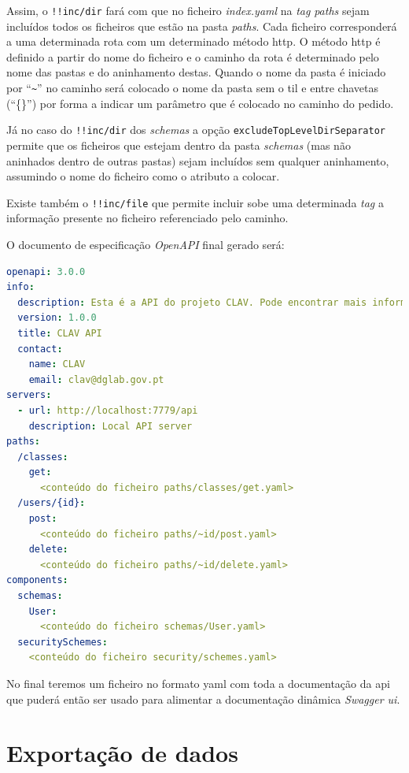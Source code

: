 Assim, o \texttt{!!inc/dir} fará com que no ficheiro \textit{index.yaml} na \textit{tag} \textit{paths} sejam incluídos todos os ficheiros que estão na pasta \textit{paths}. Cada ficheiro corresponderá a uma determinada rota com um determinado método \acrshort{http}. O método \acrshort{http} é definido a partir do nome do ficheiro e o caminho da rota é determinado pelo nome das pastas e do aninhamento destas. Quando o nome da pasta é iniciado por ``\verb|~|'' no caminho será colocado o nome da pasta sem o til e entre chavetas (``\{\}'') por forma a indicar um parâmetro que é colocado no caminho do pedido.

Já no caso do \texttt{!!inc/dir} dos \textit{schemas} a opção \texttt{excludeTopLevelDirSeparator} permite que os ficheiros que estejam dentro da pasta \textit{schemas} (mas não aninhados dentro de outras pastas) sejam incluídos sem qualquer aninhamento, assumindo o nome do ficheiro como o atributo a colocar.

Existe também o \texttt{!!inc/file} que permite incluir sobe uma determinada \textit{tag} a informação presente no ficheiro referenciado pelo caminho.

O documento de especificação \textit{OpenAPI} final gerado será:
\begin{lstlisting}[language=yaml, caption=Documento de especificação \textit{OpenAPI} gerado a partir do ficheiro \textit{index.yaml} com o uso da \textit{package} \texttt{yaml-include}, label=exem:yamlif]
openapi: 3.0.0
info:
  description: Esta é a API do projeto CLAV. Pode encontrar mais informação sobre o CLAV em [http://clav.dglab.gov.pt](http://clav.dglab.gov.pt).
  version: 1.0.0
  title: CLAV API
  contact:
    name: CLAV
    email: clav@dglab.gov.pt
servers:
  - url: http://localhost:7779/api
    description: Local API server
paths:
  /classes:
    get:
      <conteúdo do ficheiro paths/classes/get.yaml>
  /users/{id}:
    post:
      <conteúdo do ficheiro paths/~id/post.yaml>
    delete:
      <conteúdo do ficheiro paths/~id/delete.yaml>
components:
  schemas:
    User:
      <conteúdo do ficheiro schemas/User.yaml>
  securitySchemes:
    <conteúdo do ficheiro security/schemes.yaml>
\end{lstlisting}

No final teremos um ficheiro no formato \acrshort{yaml} com toda a documentação da \acrshort{api} que puderá então ser usado para alimentar a documentação dinâmica \textit{Swagger \acrshort{ui}}.

\section{Exportação de dados}\label{sec:exportacao}

